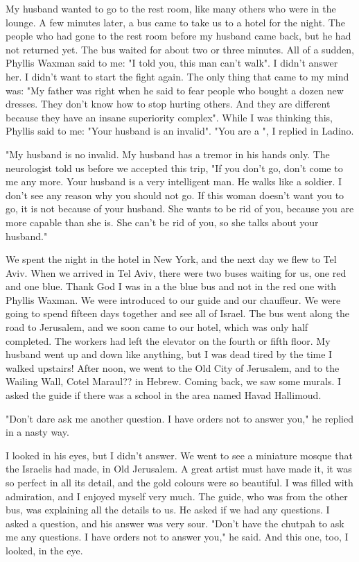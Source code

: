 My husband wanted to go to the rest room, like many others who were in the lounge.
A few minutes later, a bus came to take us to a hotel for the night.
The people who had gone to the rest room before my husband came back, but he had not returned yet.
The bus waited for about two or three minutes.
All of a sudden, Phyllis Waxman said to me: "I told you, this man can't walk".
I didn't answer her.
I didn't want to start the fight again.
The only thing that came to my mind was: "My father was right when he said to fear people who bought a dozen new dresses.
They don't know how to stop hurting others.
And they are different because they have an insane superiority complex".
While I was thinking this, Phyllis said to me: "Your husband is an invalid". 
"You are a ", I replied in Ladino.

"My husband is no invalid.
My husband has a tremor in his hands only.
The neurologist told us before we accepted this trip, "If you don't go, don't come to me any more.
Your husband is a very intelligent man.
He walks like a soldier.
I don't see any reason why you should not go.
If this woman doesn't want you to go, it is not because of your husband.
She wants to be rid of you, because you are more capable than she is.
She can't be rid of you, so she talks about your husband." 

We spent the night in the hotel in New York, and the next day we flew to Tel Aviv.
When we arrived in Tel Aviv, there were two buses waiting for us, one red and one blue.
Thank God I was in a the blue bus and not in the red one with Phyllis Waxman. 
We were introduced to our guide and our chauffeur.
We were  going to spend fifteen days together and see all of Israel.
The bus went along the road to Jerusalem, and we soon came to our hotel, which was only half completed.
The workers had left the elevator on the fourth or fifth floor.
My husband went up and down like anything, but I was dead tired by the time I walked upstairs! 
After noon, we went to the Old City of Jerusalem, and to the Wailing Wall, Cotel Maraul?? in Hebrew.
Coming back, we saw some murals.
I asked the guide if there was a school in the area named Havad Hallimoud. 

"Don't dare ask me another question.
I have orders not to answer you," he replied in a nasty way.

I looked in his eyes, but I didn't answer. 
We went to see a miniature mosque that the Israelis had made, in Old Jerusalem.
A great artist must have made it, it was so perfect in all its detail, and the gold colours were so beautiful.
I was filled with admiration, and I enjoyed myself very much.
The guide, who was from the other bus, was explaining all the details to us.
He asked if we had any questions.
I asked a question, and his  answer was very sour.
"Don't have the chutpah to ask me any questions.
I have orders not to answer you," he said.
And this one, too, I looked, in the eye.

